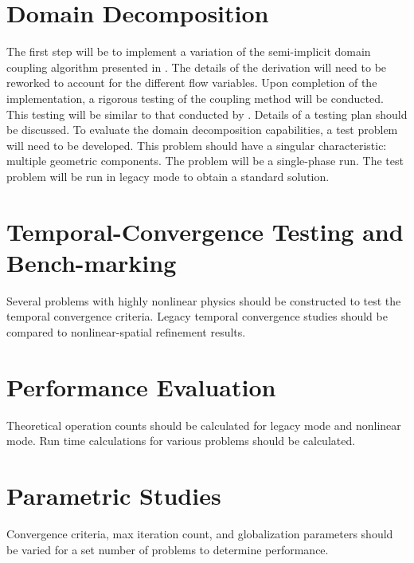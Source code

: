 \section{Domain Decomposition}
\label{sect:domain_coupling}
The first step will be to implement a variation of the semi-implicit domain coupling algorithm presented in .
The details of the derivation will need to be reworked to account for the different flow variables.
Upon completion of the implementation, a rigorous testing of the coupling method will be conducted.
This testing will be similar to that conducted by \citet{Weaver2002}.
Details of a testing plan should be discussed.
To evaluate the domain decomposition capabilities, a test problem will need to be developed.
This problem should have a singular characteristic: multiple geometric components.
The problem will be a single-phase run.
The test problem will be run in legacy mode to obtain a standard solution.


\section{Temporal-Convergence Testing and Bench-marking}
\label{sect:proposal_temporal_testing}
Several problems with highly nonlinear physics should be constructed to test the temporal convergence criteria.
Legacy temporal convergence studies should be compared to nonlinear-spatial refinement results.

\section{Performance Evaluation}
\label{sect:proposal_performance_evaluation}
Theoretical operation counts should be calculated for legacy mode and nonlinear mode.
Run time calculations for various problems should be calculated.

\section{Parametric Studies}
\label{sect:proposal_parametric_studies}
Convergence criteria, max iteration count, and globalization parameters should be varied for a set number of problems to determine performance.

